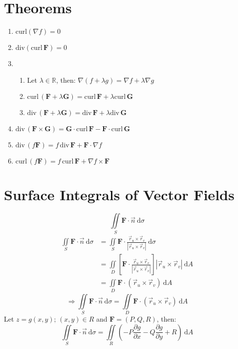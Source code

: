 \documentclass[12pt, fleqn]{book}
\newcommand{\D}{\mathrm{d}}
\newcommand{\iis}{\iint\limits_S}
\newcommand{\rutrv}{\vec{r}_u \times \vec{r}_v\right}
\newcommand{\F}{\mathbf{F}}
\newcommand{\G}{\mathbf{G}}
\newcommand{\Curl}{\mathrm{curl}}
\newcommand{\Div}{\mathrm{div}}
\newcommand{\xy}{(x, y)}
\newcommand{\rond}[2]{\frac{\partial #1}{\partial #2}}
\begin{document}
     	\section{Theorems}
     		\begin{enumerate}
     			\item $\Curl(\nabla f) = 0$
     			\item $\Div(\Curl \, \F) = 0$
                \item \begin{enumerate}
     					\item Let $\lambda \in \mathbb{R}$, then: $\nabla(f + \lambda g) = \nabla f + \lambda \nabla g$
		     			\item $\Curl \, (\F + \lambda \G) = \Curl \, \F + \lambda\Curl \, \G$
		     			\item $\Div \, (\F + \lambda \G) = \Div \, \F + \lambda\Div \, \G$
     			\end{enumerate}
     			\item $\Div \, (\F \times \G) = \G \cdot \Curl \, \F - \F \cdot \Curl \, \G$
     			\item $\Div \, (f \F) = f \, \Div \, \F + \F \cdot \nabla f$
     			\item $\Curl \, (f \F) = f \, \Curl \, \F + \nabla f \times \F$
     		\end{enumerate}
     	\section{Surface Integrals of Vector Fields}
     		\begin{equation}
     			\iis \F \cdot \vec{n} \ \D \sigma
     		\end{equation}
     		\begin{equation*}
     			\begin{split}
     				\iis \F \cdot \vec{n} \ \D \sigma
     				&  = \iis \F \cdot \frac{\vec{r}_u \times \vec{r}_v}{\left|\rutrv|} \ \D \sigma \\
     				& = \iint\limits_D \left[\F \cdot \frac{\vec{r}_u \times \vec{r}_v}{\left|\rutrv|}\right] \left|\rutrv| \ \D A \\
     				& = \iint\limits_D \F \cdot \left(\rutrv) \ \D A
     			\end{split}
     		\end{equation*}
     	    \begin{equation}
     	    	\Rightarrow 
     	    	\iis \F \cdot \vec{n} \ \D \sigma = \iint\limits_D \F \cdot \left(\rutrv) \ \D A
     	    \end{equation}
     		Let $z = g\xy; \, \xy \in R$ and $\F = (P, Q, R)$, then:
     		\begin{equation}
     			\iis \F \cdot \vec{n} \ \D \sigma = 
     			\iint\limits_R \left(-P \rond{g}{x} - Q\rond{g}{y} + R\right) \ \D A
     		\end{equation}
\end{document}
